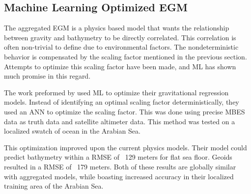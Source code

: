 \subsection{Machine Learning Optimized \ac{EGM}}
The aggregated \ac{EGM} is a physics based model that wants the relationship between gravity and bathymetry to be directly correlated.
This correlation is often non-trivial to define due to environmental factors.
The nondeterministic behavior is compensated by the scaling factor mentioned in the previous section.
Attempts to optimize this scaling factor have been made, and \ac{ML} has shown much promise in this regard.

\par
The work preformed by \cite{jena2012prediction} used \ac{ML} to optimize their gravitational regression models.
Instead of identifying an optimal scaling factor deterministically, they used an \ac{ANN} to optimize the scaling factor.
This was done using precise \ac{MBES} data as truth data and satellite altimeter data.
This method was tested on a localized swatch of ocean in the Arabian Sea.

\par
This optimization improved upon the current physics models.
Their model could predict bathymetry within a \ac{RMSE} of ~129 meters for flat sea floor.
Geoids resulted in a \ac{RMSE} of ~179 meters.
Both of these results are globally similar with aggregated models, while boasting increased accuracy in their localized training area of the Arabian Sea.

